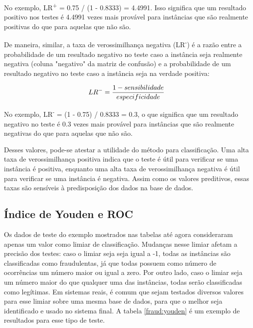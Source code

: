No exemplo, LR\textsuperscript{+} = 0.75 / (1 - 0.8333) = 4.4991. Isso significa que um resultado positivo nos testes é 4.4991 vezes mais provável para instâncias que são realmente positivas do que para aquelas que não são.

De maneira, similar, a taxa de verossimilhança negativa (LR\textsuperscript{-}) é a razão entre a probabilidade de um resultado negativo no teste caso a instância seja realmente negativa (coluna "negativo" da matriz de confusão) e a probabilidade de um resultado negativo no teste caso a instância seja na verdade positiva:

\begin{equation}
    \vspace{2mm}
    LR^{-}=\frac{1 - sensibilidade}{especificidade}
    \vspace{2mm}
\end{equation}

No exemplo, LR\textsuperscript{-} = (1 - 0.75) / 0.8333 = 0.3, o que significa que um resultado negativo no teste é 0.3 vezes mais provável para instâncias que são realmente negativas do que para aquelas que não são.

Desses valores, pode-se atestar a utilidade do método para classificação. Uma alta taxa de verossimilhança positiva indica que o teste é útil para verificar se uma instância é positiva, enquanto uma alta taxa de verossimilhança negativa é útil para verificar se uma instância é negativa. Assim como os valores preditivos, essas taxas são sensíveis à predisposição dos dados na base de dados.

\subsection{Índice de Youden e ROC}

Os dados de teste do exemplo mostrados nas tabelas até agora consideraram apenas um valor como limiar de classificação. Mudanças nesse limiar afetam a precisão dos testes: caso o limiar seja seja igual a -1, todas as instâncias são classificadas como fraudulentas, já que todas possuem como número de ocorrências um número maior ou igual a zero. Por outro lado, caso o limiar seja um número maior do que qualquer uma das instâncias, todas serão classificadas como legítimas. Em sistemas reais, é comum que sejam testados diversos valores para esse limiar sobre uma mesma base de dados, para que o melhor seja identificado e usado no sistema final. A tabela \ref{fraud:youden} é um exemplo de resultados para esse tipo de teste.

